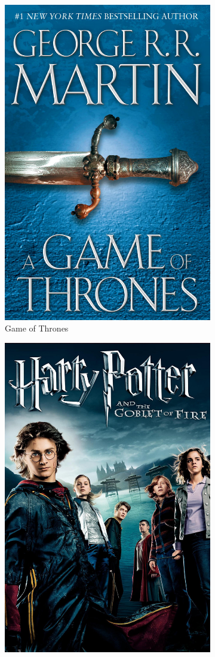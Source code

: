 \documentclass[11pt,a4paper]{article}
\begin{document}
\begin{figure}[H]
\begin{subfigure}{0.33\textwidth}
\includegraphics[width=.8\linewidth]{game}
\caption{Game of Thrones}
\end{subfigure}
\begin{subfigure}{0.33\textwidth}
\centering
\includegraphics[width=.8\linewidth]{hp4}

\end{subfigure}
\end{figure}
\end{document}
